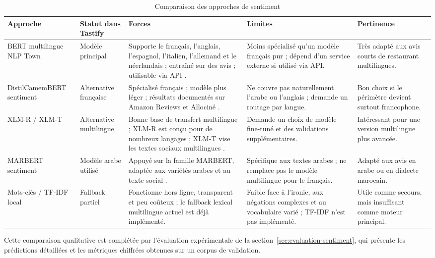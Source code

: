 \begin{table}[H]
\centering
\scriptsize
\caption{Comparaison des approches de sentiment}
\label{tab:comparaison-modeles}
\begin{tabularx}{\textwidth}{p{3.2cm}p{2.5cm}YYY}
\toprule
\textbf{Approche} & \textbf{Statut dans Tastify} & \textbf{Forces} & \textbf{Limites} & \textbf{Pertinence} \\
\midrule
BERT multilingue NLP Town & Modèle principal & Supporte le français, l'anglais, l'espagnol, l'italien, l'allemand et le néerlandais ; entraîné sur des avis ; utilisable via API \cite{nlptown,hftextclassification}. & Moins spécialisé qu'un modèle français pur ; dépend d'un service externe si utilisé via API. & Très adapté aux avis courts de restaurant multilingues. \\
DistilCamemBERT sentiment & Alternative française & Spécialisé français ; modèle plus léger ; résultats documentés sur Amazon Reviews et Allociné \cite{distilcamembert,camembert}. & Ne couvre pas naturellement l'arabe ou l'anglais ; demande un routage par langue. & Bon choix si le périmètre devient surtout francophone. \\
XLM-R / XLM-T & Alternative multilingue & Bonne base de transfert multilingue ; XLM-R est conçu pour de nombreux langages \cite{xlmroberta}; XLM-T vise les textes sociaux multilingues \cite{xlmt}. & Demande un choix de modèle fine-tuné et des validations supplémentaires. & Intéressant pour une version multilingue plus avancée. \\
MARBERT sentiment & Modèle arabe utilisé & Appuyé sur la famille MARBERT, adaptée aux variétés arabes et au texte social \cite{marbert}. & Spécifique aux textes arabes ; ne remplace pas le modèle multilingue pour le français. & Adapté aux avis en arabe ou en dialecte marocain. \\
Mots-clés / TF-IDF local & Fallback partiel & Fonctionne hors ligne, transparent et peu coûteux ; le fallback lexical multilingue actuel est déjà implémenté. & Faible face à l'ironie, aux négations complexes et au vocabulaire varié ; TF-IDF n'est pas implémenté. & Utile comme secours, mais insuffisant comme moteur principal. \\
\bottomrule
\end{tabularx}
\end{table}

Cette comparaison qualitative est complétée par l'évaluation expérimentale de la section~\ref{sec:evaluation-sentiment}, qui présente les prédictions détaillées et les métriques chiffrées obtenues sur un corpus de validation.

